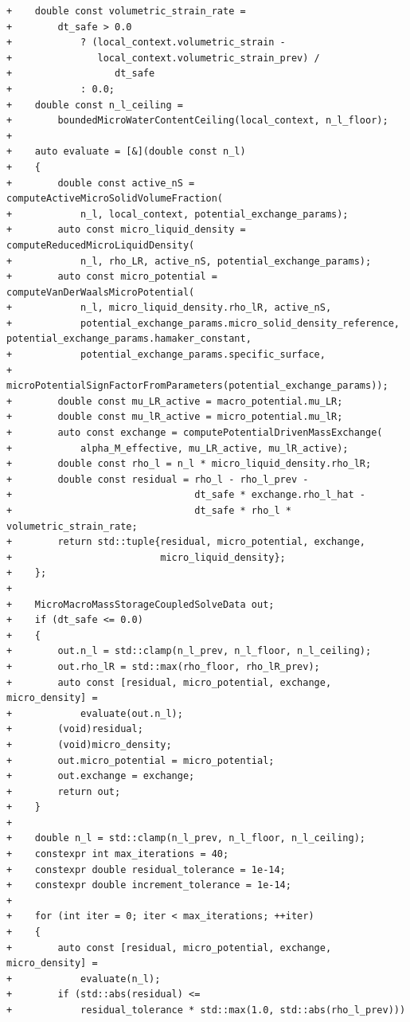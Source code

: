 \documentclass[10pt]{article}
\begin{document}
\begin{lstlisting}
+    double const volumetric_strain_rate =
+        dt_safe > 0.0
+            ? (local_context.volumetric_strain -
+               local_context.volumetric_strain_prev) /
+                  dt_safe
+            : 0.0;
+    double const n_l_ceiling =
+        boundedMicroWaterContentCeiling(local_context, n_l_floor);
+
+    auto evaluate = [&](double const n_l)
+    {
+        double const active_nS = computeActiveMicroSolidVolumeFraction(
+            n_l, local_context, potential_exchange_params);
+        auto const micro_liquid_density = computeReducedMicroLiquidDensity(
+            n_l, rho_LR, active_nS, potential_exchange_params);
+        auto const micro_potential = computeVanDerWaalsMicroPotential(
+            n_l, micro_liquid_density.rho_lR, active_nS,
+            potential_exchange_params.micro_solid_density_reference, potential_exchange_params.hamaker_constant,
+            potential_exchange_params.specific_surface,
+            microPotentialSignFactorFromParameters(potential_exchange_params));
+        double const mu_LR_active = macro_potential.mu_LR;
+        double const mu_lR_active = micro_potential.mu_lR;
+        auto const exchange = computePotentialDrivenMassExchange(
+            alpha_M_effective, mu_LR_active, mu_lR_active);
+        double const rho_l = n_l * micro_liquid_density.rho_lR;
+        double const residual = rho_l - rho_l_prev -
+                                dt_safe * exchange.rho_l_hat -
+                                dt_safe * rho_l * volumetric_strain_rate;
+        return std::tuple{residual, micro_potential, exchange,
+                          micro_liquid_density};
+    };
+
+    MicroMacroMassStorageCoupledSolveData out;
+    if (dt_safe <= 0.0)
+    {
+        out.n_l = std::clamp(n_l_prev, n_l_floor, n_l_ceiling);
+        out.rho_lR = std::max(rho_floor, rho_lR_prev);
+        auto const [residual, micro_potential, exchange, micro_density] =
+            evaluate(out.n_l);
+        (void)residual;
+        (void)micro_density;
+        out.micro_potential = micro_potential;
+        out.exchange = exchange;
+        return out;
+    }
+
+    double n_l = std::clamp(n_l_prev, n_l_floor, n_l_ceiling);
+    constexpr int max_iterations = 40;
+    constexpr double residual_tolerance = 1e-14;
+    constexpr double increment_tolerance = 1e-14;
+
+    for (int iter = 0; iter < max_iterations; ++iter)
+    {
+        auto const [residual, micro_potential, exchange, micro_density] =
+            evaluate(n_l);
+        if (std::abs(residual) <=
+            residual_tolerance * std::max(1.0, std::abs(rho_l_prev)))

\end{lstlisting}
\end{document}
